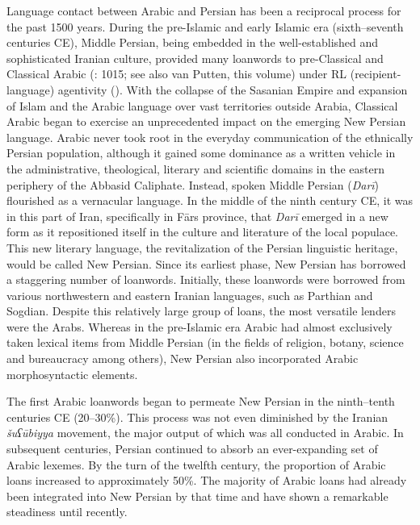 \documentclass[output=paper]{langsci/langscibook}
\begin{document}
Language contact between Arabic and Persian has been a reciprocal process for the past 1500 years. During the pre-Islamic and early Islamic era (sixth–seventh centuries CE), Middle Persian, being embedded in the well-established and sophisticated Iranian culture, provided many loanwords to pre-Classical and Classical Arabic (\citealt{Gazsi2011}: 1015; see also van Putten, this volume) under RL (recipient-language) agentivity (\citealt{VanCoetsem1988,VanCoetsem2000}). With the collapse of the Sasanian Empire and expansion of Islam and the Arabic language over vast territories outside Arabia, Classical Arabic began to exercise an unprecedented impact on the emerging New Persian language. Arabic never took root in the everyday communication of the ethnically Persian population, although it gained some dominance as a written vehicle in the administrative, theological, literary and scientific domains in the eastern periphery of the Abbasid Caliphate. Instead, spoken Middle Persian (\textit{Darī}) flourished as a vernacular language. In the middle of the ninth century CE, it was in this part of Iran, specifically in Fārs province, that \textit{Darī} emerged in a new form as it repositioned itself in the culture and literature of the local populace. This new literary language, the revitalization of the Persian linguistic heritage, would be called New Persian. Since its earliest phase, New Persian has borrowed a staggering number of loanwords. Initially, these loanwords were borrowed from various northwestern and eastern Iranian languages, such as Parthian and Sogdian. Despite this relatively large group of loans, the most versatile lenders were the Arabs. Whereas in the pre-Islamic era Arabic had almost exclusively taken lexical items from Middle Persian (in the fields of religion, botany, science and bureaucracy among others), New Persian also incorporated Arabic morphosyntactic elements.

The first Arabic loanwords began to permeate New Persian in the ninth–tenth centuries CE (20–30\%). This process was not even diminished by the Iranian \textit{šuʕūbiyya} movement, the major output of which was all conducted in Arabic. In subsequent centuries, Persian continued to absorb an ever-expanding set of Arabic lexemes. By the turn of the twelfth century, the proportion of Arabic loans increased to approximately 50\%. The majority of Arabic loans had already been integrated into New Persian by that time and have shown a remarkable steadiness until recently.
\end{document}
